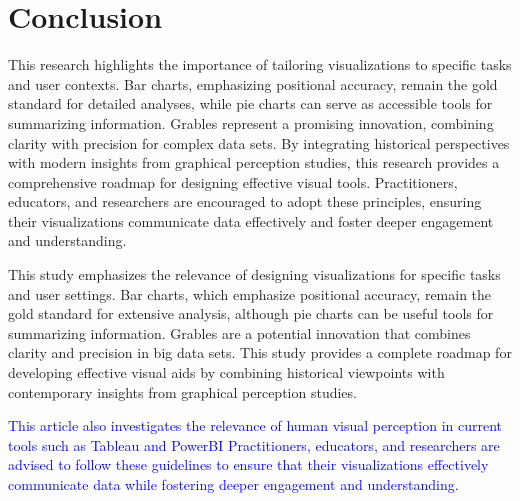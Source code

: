 \documentclass[
  10pt,
  letterpaper,
  twocolumn]{article}
\newcommand{\mt}[1]{{\textcolor{blue}{#1}}}
\begin{document}
\hypertarget{conclusion}{%
\section{Conclusion}\label{conclusion}}

This research highlights the importance of tailoring visualizations to
specific tasks and user contexts. Bar charts, emphasizing positional
accuracy, remain the gold standard for detailed analyses, while pie
charts can serve as accessible tools for summarizing information.
Grables represent a promising innovation, combining clarity with
precision for complex data sets. By integrating historical perspectives
with modern insights from graphical perception studies, this research
provides a comprehensive roadmap for designing effective visual tools.
Practitioners, educators, and researchers are encouraged to adopt these
principles, ensuring their visualizations communicate data effectively
and foster deeper engagement and understanding.

This study emphasizes the relevance of designing visualizations for
specific tasks and user settings. Bar charts, which emphasize positional
accuracy, remain the gold standard for extensive analysis, although pie
charts can be useful tools for summarizing information. Grables are a
potential innovation that combines clarity and precision in big data
sets. This study provides a complete roadmap for developing effective
visual aids by combining historical viewpoints with contemporary
insights from graphical perception studies.

\mt{This article also investigates the relevance of human visual
perception in current tools such as Tableau and PowerBI Practitioners,
educators, and researchers are advised to follow these guidelines to
ensure that their visualizations effectively communicate data while
fostering deeper engagement and understanding.}
\end{document}
